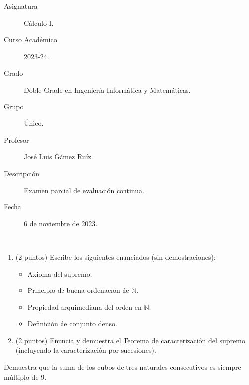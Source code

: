 \documentclass[12pt]{article}
\begin{document}

    
    

    \begin{description}
        \item[Asignatura] Cálculo I.
        \item[Curso Académico] 2023-24.
        \item[Grado] Doble Grado en Ingeniería Informática y Matemáticas.
        \item[Grupo] Único.
        \item[Profesor] José Luis Gámez Ruíz.
        \item[Descripción] Examen parcial de evaluación continua.
        \item[Fecha] 6 de noviembre de 2023.
    
    \end{description}
    \newpage
    

    \begin{ejercicio}~
        \begin{enumerate}
            \item (2 puntos) Escribe los siguientes enunciados (sin demostraciones):
            \begin{itemize}
                \item Axioma del supremo.
                \item Principio de buena ordenación de $\mathbb{N}$.
                \item Propiedad arquimediana del orden en $\mathbb{N}$.
                \item Definición de conjunto denso.
            \end{itemize}
            \item (2 puntos) Enuncia y demuestra el Teorema de caracterización del supremo (incluyendo la caracterización por sucesiones).
        \end{enumerate}
    \end{ejercicio}
        
    \begin{ejercicio}
        [2.5 puntos] Demuestra que la suma de los cubos de tres naturales consecutivos es siempre múltiplo de 9.
    \end{ejercicio}
        
\end{document}
